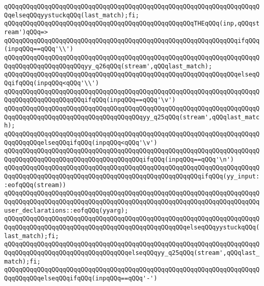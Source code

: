 \verb|qQQqqQQqqQQqqQQqqQQqqQQqqQQqqQQqqQQqqQQqqQQqqQQqqQQqqQQqqQQqqQQqqQQqqQQqelseqQQqyystuckqQQq(last_match);fi;|\newline
\verb|qQQqqQQqqQQqqQQqqQQqqQQqqQQqqQQqqQQqqQQqqQQqqQQqqQQqTHEqQQq(inp,qQQqstream')qQQq=>|\newline
\verb|qQQqqQQqqQQqqQQqqQQqqQQqqQQqqQQqqQQqqQQqqQQqqQQqqQQqqQQqqQQqqQQqifqQQq(inpqQQq==qQQq'\\')|\newline
\verb|qQQqqQQqqQQqqQQqqQQqqQQqqQQqqQQqqQQqqQQqqQQqqQQqqQQqqQQqqQQqqQQqqQQqqQQqqQQqqQQqqQQqqQQqqQQqyy_q26qQQq(stream',qQQqlast_match);|\newline
\verb|qQQqqQQqqQQqqQQqqQQqqQQqqQQqqQQqqQQqqQQqqQQqqQQqqQQqqQQqqQQqqQQqelseqQQqifqQQq(inpqQQq<qQQq'\\')|\newline
\verb|qQQqqQQqqQQqqQQqqQQqqQQqqQQqqQQqqQQqqQQqqQQqqQQqqQQqqQQqqQQqqQQqqQQqqQQqqQQqqQQqqQQqqQQqqQQqifqQQq(inpqQQq==qQQq'\v')|\newline
\verb|qQQqqQQqqQQqqQQqqQQqqQQqqQQqqQQqqQQqqQQqqQQqqQQqqQQqqQQqqQQqqQQqqQQqqQQqqQQqqQQqqQQqqQQqqQQqqQQqqQQqqQQqqQQqyy_q25qQQq(stream',qQQqlast_match);|\newline
\verb|qQQqqQQqqQQqqQQqqQQqqQQqqQQqqQQqqQQqqQQqqQQqqQQqqQQqqQQqqQQqqQQqqQQqqQQqqQQqqQQqelseqQQqifqQQq(inpqQQq<qQQq'\v')|\newline
\verb|qQQqqQQqqQQqqQQqqQQqqQQqqQQqqQQqqQQqqQQqqQQqqQQqqQQqqQQqqQQqqQQqqQQqqQQqqQQqqQQqqQQqqQQqqQQqqQQqqQQqqQQqqQQqifqQQq(inpqQQq==qQQq'\n')|\newline
\verb|qQQqqQQqqQQqqQQqqQQqqQQqqQQqqQQqqQQqqQQqqQQqqQQqqQQqqQQqqQQqqQQqqQQqqQQqqQQqqQQqqQQqqQQqqQQqqQQqqQQqqQQqqQQqqQQqqQQqqQQqqQQqifqQQq(yy_input::eofqQQq(stream))|\newline
\verb|qQQqqQQqqQQqqQQqqQQqqQQqqQQqqQQqqQQqqQQqqQQqqQQqqQQqqQQqqQQqqQQqqQQqqQQqqQQqqQQqqQQqqQQqqQQqqQQqqQQqqQQqqQQqqQQqqQQqqQQqqQQqqQQqqQQqqQQqqQQquser_declarations::eofqQQq(yyarg);|\newline
\verb|qQQqqQQqqQQqqQQqqQQqqQQqqQQqqQQqqQQqqQQqqQQqqQQqqQQqqQQqqQQqqQQqqQQqqQQqqQQqqQQqqQQqqQQqqQQqqQQqqQQqqQQqqQQqqQQqqQQqqQQqelseqQQqyystuckqQQq(last_match);fi;|\newline
\verb|qQQqqQQqqQQqqQQqqQQqqQQqqQQqqQQqqQQqqQQqqQQqqQQqqQQqqQQqqQQqqQQqqQQqqQQqqQQqqQQqqQQqqQQqqQQqqQQqqQQqqQQqelseqQQqyy_q25qQQq(stream',qQQqlast_match);fi;|\newline
\verb|qQQqqQQqqQQqqQQqqQQqqQQqqQQqqQQqqQQqqQQqqQQqqQQqqQQqqQQqqQQqqQQqqQQqqQQqqQQqqQQqelseqQQqifqQQq(inpqQQq==qQQq'-')|\newline
